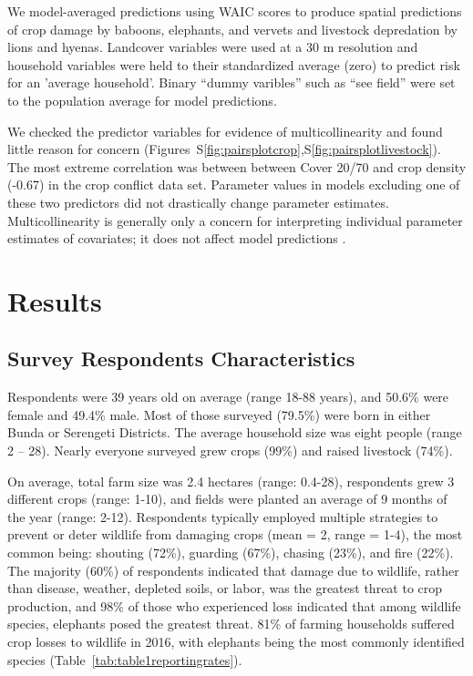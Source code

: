 \documentclass[12pt,]{article}
\begin{document}
We model-averaged predictions using WAIC scores to produce spatial predictions of crop damage by baboons, elephants, and vervets and livestock depredation by lions and hyenas. Landcover variables were used at a 30 m resolution and household variables were held to their standardized average (zero) to predict risk for an 'average household'. Binary ``dummy varibles'' such as ``see field'' were set to the population average for model predictions.


We checked the predictor variables for evidence of multicollinearity and found little reason for concern (Figures~S\ref{fig:pairsplotcrop},S\ref{fig:pairsplotlivestock}). The most extreme correlation was between between Cover 20/70 and crop density (-0.67) in the crop conflict data set. Parameter values in models excluding one of these two predictors did not drastically change parameter estimates. Multicollinearity is generally only a concern for interpreting individual parameter estimates of covariates; it does not affect model predictions \citep{McElreath2020}.

\section{Results}

\subsection{Survey Respondents Characteristics}

Respondents were 39 years old on average (range 18-88 years), and 50.6\% were female and 49.4\% male. Most of those surveyed (79.5\%) were born in either Bunda or Serengeti Districts. The average household size was eight people (range 2 – 28). Nearly everyone surveyed grew crops (99\%) and raised livestock (74\%). 

On average, total farm size was 2.4 hectares (range: 0.4-28), respondents grew 3 different crops (range: 1-10), and fields were planted an average of 9 months of the year (range: 2-12). Respondents typically employed multiple strategies to prevent or deter wildlife from damaging crops (mean = 2, range = 1-4), the most common being: shouting (72\%), guarding (67\%), chasing (23\%), and fire (22\%). The majority (60\%) of respondents indicated that damage due to wildlife, rather than disease, weather, depleted soils, or labor, was the greatest threat to crop production, and 98\% of those who experienced loss indicated that among wildlife species, elephants posed the greatest threat. 81\% of farming households suffered crop losses to wildlife in 2016, with elephants being the most commonly identified species (Table~\ref{tab:table1reportingrates}).  
\end{document}
